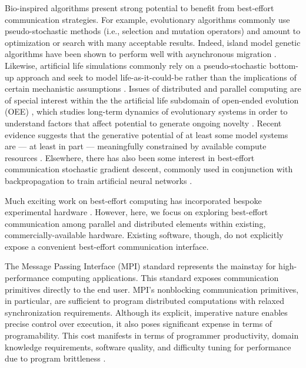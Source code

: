 Bio-inspired algorithms present strong potential to benefit from best-effort communication strategies.
For example, evolutionary algorithms commonly use pseudo-stochastic methods (i.e., selection and mutation operators) and amount to optimization or search with many acceptable results.
Indeed, island model genetic algorithms have been shown to perform well with asynchronous migration \citep{izzo2009parallel}.
Likewise, artificial life simulations commonly rely on a pseudo-stochastic bottom-up approach and seek to model life-as-it-could-be rather than the implications of certain mechanistic assumptions \citep{bonabeau1994we}.
Issues of distributed and parallel computing are of special interest within the the artificial life subdomain of open-ended evolution (OEE) \citep{ackley2014indefinitely}, which studies long-term dynamics of evolutionary systems in order to understand factors that affect potential to generate ongoing novelty \citep{taylor2016open}.
Recent evidence suggests that the generative potential of at least some model systems are --- at least in part --- meaningfully constrained by available compute resources \citep{channon2019maximum}.
Elsewhere, there has also been some interest in best-effort communication stochastic gradient descent, commonly used in conjunction with backpropagation to train artificial neural networks \citep{niu2011hogwild,noel2014dogwild}.

Much exciting work on best-effort computing has incorporated bespoke experimental hardware \citep{chippa2014scalable, ackley2011homeostatic, cho2012ersa, chakrapani2008probabilistic}.
However, here, we focus on exploring best-effort communication among parallel and distributed elements within existing, commercially-available hardware.
Existing software, though, do not explicitly expose a convenient best-effort communication interface.

The Message Passing Interface (MPI) standard \citep{gropp1996high} represents the mainstay for high-performance computing applications.
This standard exposes communication primitives directly to the end user.
MPI's nonblocking communication primitives, in particular, are sufficient to program distributed computations with relaxed synchronization requirements.
Although its explicit, imperative nature enables precise control over execution, it also poses significant expense in terms of programability.
This cost manifests in terms of programmer productivity, domain knowledge requirements, software quality, and difficulty tuning for performance due to program brittleness \citep{gu2019comparative, tang2014mpi}.


